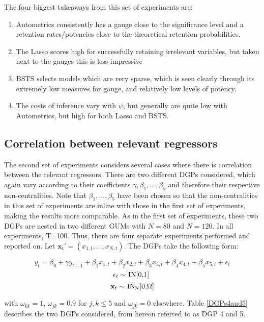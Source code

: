 \documentclass[11pt, oneside]{book}   	%
\begin{document}
The four biggest takeaways from this set of experiments are:
\begin{enumerate}
\item Autometrics consistently has a gauge close to the significance level and a retention rates/potencies close to the theoretical retention probabilities.
\item The Lasso scores high for successfully retaining irrelevant variables, but taken next to the gauges this is less impressive
\item BSTS selects models which are very sparse, which is seen clearly through its extremely low measures for gauge, and relatively low levels of potency.
\item The costs of inference vary with $\psi$, but generally are quite low with Autometrics, but high for both Lasso and BSTS.
\end{enumerate}





\clearpage

\subsection{Correlation between relevant regressors}

The second set of experiments considers several cases where there is correlation between the relevant regressors. There are two different DGPs considered, which again vary according to their coefficients $\gamma,\beta_{1},...,\beta_{5}$ and therefore their respective non-centralities. Note that $\beta_{1},...,\beta_{5}$ have been chosen so that the non-centralities in this set of experiments are inline with those in the first set of experiments, making the results more comparable. As in the first set of experiments, these two DGPs are nested in two different GUMs with $N=80$ and $N=120$. In all experiments, T=100. Thus, there are four separate experiments performed and reported on.   Let $\textbf{x}_{t}'=(x_{1,t},...,x_{N,t})$. The DGPs take the following form: 

$$y_{t}=\beta_{0} + \gamma y_{t-1}+\beta_{1}x_{1,t}+\beta_{2}x_{2,t}+ \beta_{3}x_{3,t}+ \beta_{4}x_{4,t}+ \beta_{5}x_{5,t} + \epsilon_{t}$$
$$\centerline{$\epsilon_{t} \sim $ IN[0,1] }$$
 $$\centerline{$\textbf{x}_{t} \sim $ IN\textsubscript{N}[0,$\Omega$]}$$

with $\omega_{kk} = 1 $, $\omega_{jk} = 0.9 $ for $j,k \leq 5$ and $\omega_{jk} = 0 $ elsewhere. Table \ref{DGPs4and5}  describes the two DGPs considered, from hereon referred to as DGP 4 and 5.
\end{document}
